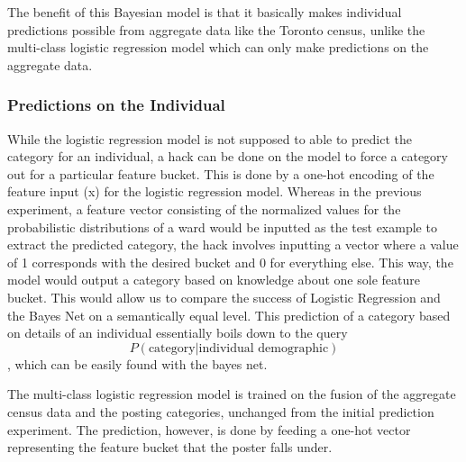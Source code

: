 \documentclass[12pt]{article}
\begin{document}


The benefit of this Bayesian model is that it basically makes individual predictions possible from aggregate data like the Toronto census, unlike the multi-class logistic regression model which can only make predictions on the aggregate data.  

\subsubsection{Predictions on the Individual}
While the logistic regression model is not supposed to able to predict the category for an individual, a hack can be done on the model to force a category out for a particular feature bucket. This is done by a one-hot encoding of the feature input (x) for the logistic regression model. Whereas in the previous experiment, a feature vector consisting of the normalized values for the probabilistic distributions of a ward would be inputted as the test example to extract the predicted category, the hack involves inputting a vector where a value of 1 corresponds with the desired bucket and 0 for everything else. This way, the model would output a category based on knowledge about one sole feature bucket. This would allow us to compare the success of Logistic Regression and the Bayes Net on a semantically equal level.
This prediction of a category based on details of an individual essentially boils down to the query  \[P(\text{category} | \text{individual demographic})\], which can be easily found with the bayes net. 

The multi-class logistic regression model is trained on the fusion of the aggregate census data and the posting categories, unchanged from the initial prediction experiment. The prediction, however, is done by feeding a one-hot vector representing the feature bucket that the poster falls under. 
\end{document}
